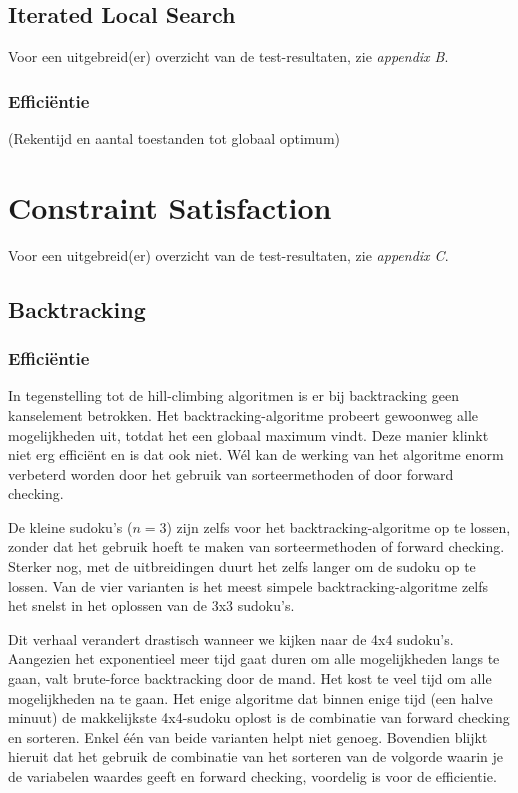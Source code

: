 \documentclass[]{report}
\begin{document}
\subsection{Iterated Local Search}
Voor een uitgebreid(er) overzicht van de test-resultaten, zie \textit{appendix B}.
\subsubsection{Effici\"{e}ntie}
(Rekentijd en aantal toestanden tot globaal optimum)
\section{Constraint Satisfaction}
Voor een uitgebreid(er) overzicht van de test-resultaten, zie \textit{appendix C}.
\subsection{Backtracking}
\subsubsection{Effici\"{e}ntie}
In tegenstelling tot de hill-climbing algoritmen is er bij backtracking geen kanselement betrokken. Het backtracking-algoritme probeert gewoonweg alle mogelijkheden uit, totdat het een globaal maximum vindt. Deze manier klinkt niet erg effici\"ent en is dat ook niet. W\'el kan de werking van het algoritme enorm verbeterd worden door het gebruik van sorteermethoden of door forward checking. 

De kleine sudoku's ($n = 3$) zijn zelfs voor het backtracking-algoritme op te lossen, zonder dat het gebruik hoeft te maken van sorteermethoden of forward checking. Sterker nog, met de uitbreidingen duurt het zelfs langer om de sudoku op te lossen. Van de vier varianten is het meest simpele backtracking-algoritme zelfs het snelst in het oplossen van de 3x3 sudoku's.

Dit verhaal verandert drastisch wanneer we kijken naar de 4x4 sudoku's. Aangezien het exponentieel meer tijd gaat duren om alle mogelijkheden langs te gaan, valt brute-force backtracking door de mand. Het kost te veel tijd om alle mogelijkheden na te gaan. Het enige algoritme dat binnen enige tijd (een halve minuut) de makkelijkste 4x4-sudoku oplost is de combinatie van forward checking en sorteren. Enkel \'e\'en van beide varianten helpt niet genoeg. Bovendien blijkt hieruit dat het gebruik de combinatie van het sorteren van de volgorde waarin je de variabelen waardes geeft en forward checking, voordelig is voor de efficientie.  
\end{document}
